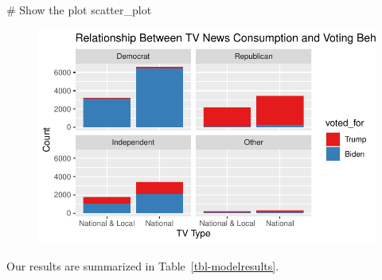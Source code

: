 \documentclass[
  letterpaper,
  DIV=11,
  numbers=noendperiod]{scrartcl}
\newenvironment{Shaded}{\begin{snugshade}}{\end{snugshade}}
\newcommand{\CommentTok}[1]{\textcolor[rgb]{0.37,0.37,0.37}{#1}}
\newcommand{\NormalTok}[1]{\textcolor[rgb]{0.00,0.23,0.31}{#1}}
\begin{document}
\begin{Shaded}
\begin{Highlighting}[]
\CommentTok{\# Show the plot}
\NormalTok{scatter\_plot}
\end{Highlighting}
\end{Shaded}

\begin{figure}[H]

{\centering \includegraphics{paper_files/figure-pdf/unnamed-chunk-11-1.pdf}

}

\end{figure}

Our results are summarized in Table~\ref{tbl-modelresults}.
\end{document}
